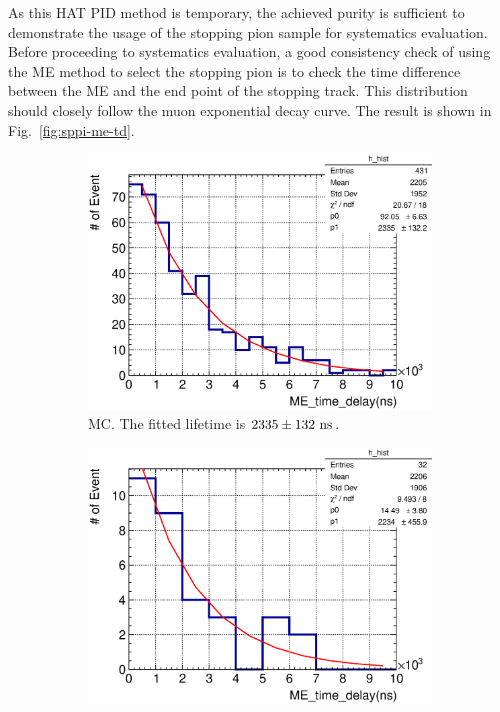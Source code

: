          As this HAT PID method is temporary, the achieved purity is sufficient to demonstrate the usage of the stopping pion sample for systematics evaluation.
          Before proceeding to systematics evaluation, a good consistency check of using the ME method to select the stopping pion is to check the time difference between the ME and the end point of the stopping track.
          This distribution should closely follow the muon exponential decay curve.
          The result is shown in Fig.~\ref{fig:sppi-me-td}.

          \begin{figure}[ht]
               \centering
               \begin{subfigure}{\dbfigwid\textwidth}
                    \includegraphics[width=\textwidth]{figures/sel/sspi_TOP_ME_td_hist_al6_sfgfinposfit_comb.eps}
                    \caption{MC. The fitted lifetime is $2335\pm132~\textrm{ns}$.}
                    \label{subfig:sppi-me-td-mc}
               \end{subfigure}
               \begin{subfigure}{\dbfigwid\textwidth}
                    \includegraphics[width=\textwidth]{figures/sel/sspi_TOP_ME_td_hist_al6_sfgfinpos_fit.eps}

\end{subfigure}
\end{figure}
